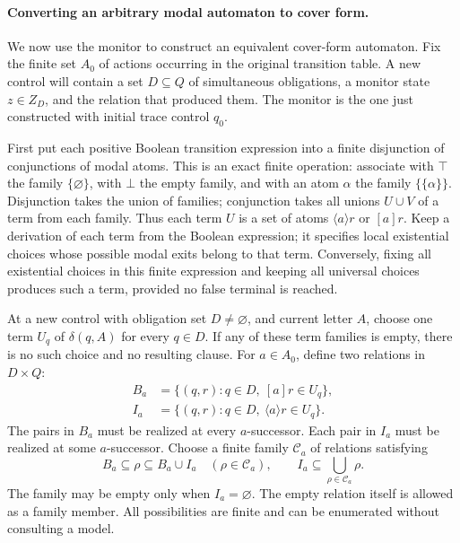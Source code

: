 \paragraph{Converting an arbitrary modal automaton to cover form.}
\label{sec:p09-mu-cover-simulation}
We now use the monitor to construct
an equivalent cover-form automaton.
Fix the finite set \(A_0\) of
actions occurring in the original
transition table. A new control
will contain a set \(D\subseteq Q\)
of simultaneous obligations, a
monitor state \(z\in Z_D\), and
the relation that produced them.
The monitor is the one just
constructed with initial trace
control \(q_0\).

First put each positive Boolean
transition expression into a finite
disjunction of conjunctions of
modal atoms. This is an exact
finite operation: associate with
\(\top\) the family \(\{\varnothing\}\),
with \(\bot\) the empty family,
and with an atom \(\alpha\) the
family \(\{\{\alpha\}\}\).
Disjunction takes the union of
families; conjunction takes all
unions \(U\cup V\) of a term
from each family.
Thus each term \(U\) is a set
of atoms \(\langle a\rangle r\)
or \([a]r\).
Keep a derivation of each term
from the Boolean expression;
it specifies local existential
choices whose possible modal
exits belong to that term.
Conversely, fixing all existential
choices in this finite expression
and keeping all universal choices
produces such a term, provided
no false terminal is reached.

At a new control with obligation
set \(D\ne\varnothing\), and
current letter \(A\), choose
one term \(U_q\) of \(\delta(q,A)\)
for every \(q\in D\).
If any of these term families
is empty, there is no such
choice and no resulting clause.
For \(a\in A_0\), define two
relations in \(D\times Q\):
\[
\begin{aligned}
 B_a&=\{(q,r):q\in D,\ [a]r\in U_q\},\\
 I_a&=\{(q,r):q\in D,\ \langle a\rangle r\in U_q\}.
\end{aligned}
\]
The pairs in \(B_a\) must be
realized at every \(a\)-successor.
Each pair in \(I_a\) must be
realized at some \(a\)-successor.
Choose a finite family
\(\mathcal C_a\) of relations
satisfying
\[
 B_a\subseteq\rho\subseteq B_a\cup I_a
       \quad(\rho\in\mathcal C_a),\qquad
 I_a\subseteq\bigcup_{\rho\in\mathcal C_a}\rho.
\]
The family may be empty only
when \(I_a=\varnothing\).
The empty relation itself is
allowed as a family member.
All possibilities are finite
and can be enumerated without
consulting a model.

